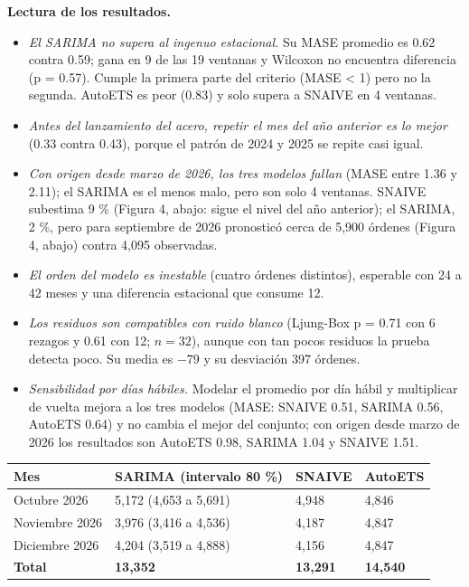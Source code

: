 \documentclass[
  spanish,
  11pt,
]{article}
\newcounter{none} %
\providecommand{\tightlist}{%
  \setlength{\itemsep}{0pt}\setlength{\parskip}{0pt}}
\begin{document}
\textbf{Lectura de los resultados.}

\begin{itemize}
\tightlist
\item
  \emph{El SARIMA no supera al ingenuo estacional.} Su MASE promedio es
  0.62 contra 0.59; gana en 9 de las 19 ventanas y Wilcoxon no encuentra
  diferencia (p = 0.57). Cumple la primera parte del criterio (MASE
  \textless{} 1) pero no la segunda. AutoETS es peor (0.83) y solo
  supera a SNAIVE en 4 ventanas.
\item
  \emph{Antes del lanzamiento del acero, repetir el mes del año anterior
  es lo mejor} (0.33 contra 0.43), porque el patrón de 2024 y 2025 se
  repite casi igual.
\item
  \emph{Con origen desde marzo de 2026, los tres modelos fallan} (MASE
  entre 1.36 y 2.11); el SARIMA es el menos malo, pero son solo 4
  ventanas. SNAIVE subestima 9 \% (Figura 4, abajo: sigue el nivel del
  año anterior); el SARIMA, 2 \%, pero para septiembre de 2026
  pronosticó cerca de 5,900 órdenes (Figura 4, abajo) contra 4,095
  observadas.
\item
  \emph{El orden del modelo es inestable} (cuatro órdenes distintos),
  esperable con 24 a 42 meses y una diferencia estacional que consume
  12.
\item
  \emph{Los residuos son compatibles con ruido blanco} (Ljung-Box p =
  0.71 con 6 rezagos y 0.61 con 12; \(n = 32\)), aunque con tan pocos
  residuos la prueba detecta poco. Su media es −79 y su desviación 397
  órdenes.
\item
  \emph{Sensibilidad por días hábiles.} Modelar el promedio por día
  hábil y multiplicar de vuelta mejora a los tres modelos (MASE: SNAIVE
  0.51, SARIMA 0.56, AutoETS 0.64) y no cambia el mejor del conjunto;
  con origen desde marzo de 2026 los resultados son AutoETS 0.98, SARIMA
  1.04 y SNAIVE 1.51.
\end{itemize}

{\def\LTcaptype{none} %
\begin{longtable}[]{@{}llll@{}}
\toprule\noalign{}
Mes & SARIMA (intervalo 80 \%) & SNAIVE & AutoETS \\
\midrule\noalign{}
\endhead
\bottomrule\noalign{}
\endlastfoot
Octubre 2026 & 5,172 (4,653 a 5,691) & 4,948 & 4,846 \\
Noviembre 2026 & 3,976 (3,416 a 4,536) & 4,187 & 4,847 \\
Diciembre 2026 & 4,204 (3,519 a 4,888) & 4,156 & 4,847 \\
\textbf{Total} & \textbf{13,352} & \textbf{13,291} & \textbf{14,540} \\
\end{longtable}
}
\end{document}

